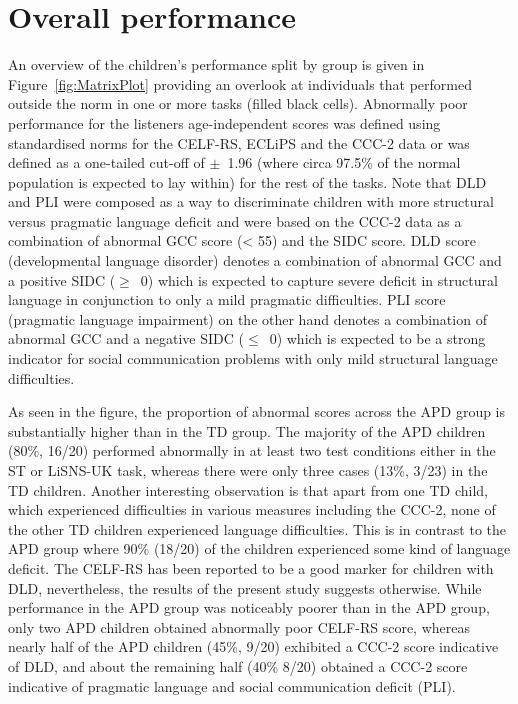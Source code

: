 \documentclass[a4paper, twoside]{templates/ociamthesis}
\begin{document}
\hypertarget{overall-performance}{%
\section{Overall performance}\label{overall-performance}}

An overview of the children's performance split by group is given in Figure~\ref{fig:MatrixPlot} providing an overlook at individuals that performed outside the norm in one or more tasks (filled black cells). Abnormally poor performance for the listeners age-independent scores was defined using standardised norms for the CELF-RS, ECLiPS and the CCC-2 data or was defined as a one-tailed cut-off of \(\pm\)~1.96 (where circa 97.5\% of the normal population is expected to lay within) for the rest of the tasks. Note that DLD and PLI were composed as a way to discriminate children with more structural versus pragmatic language deficit and were based on the CCC-2 data as a combination of abnormal GCC score (\textless{} 55) and the SIDC score. DLD score (developmental language disorder) denotes a combination of abnormal GCC and a positive SIDC (\(\geq\)~0) which is expected to capture severe deficit in structural language in conjunction to only a mild pragmatic difficulties. PLI score (pragmatic language impairment) on the other hand denotes a combination of abnormal GCC and a negative SIDC (\(\leq\)~0) which is expected to be a strong indicator for social communication problems with only mild structural language difficulties.~

As seen in the figure, the proportion of abnormal scores across the APD group is substantially higher than in the TD group. The majority of the APD children (80\%, 16/20) performed abnormally in at least two test conditions either in the ST or LiSNS-UK task, whereas there were only three cases (13\%, 3/23) in the TD children. Another interesting observation is that apart from one TD child, which experienced difficulties in various measures including the CCC-2, none of the other TD children experienced language difficulties. This is in contrast to the APD group where 90\% (18/20) of the children experienced some kind of language deficit. The CELF-RS has been reported to be a good marker for children with DLD, nevertheless, the results of the present study suggests otherwise. While performance in the APD group was noticeably poorer than in the APD group, only two APD children obtained abnormally poor CELF-RS score, whereas nearly half of the APD children (45\%, 9/20) exhibited a CCC-2 score indicative of DLD, and about the remaining half (40\% 8/20) obtained a CCC-2 score indicative of pragmatic language and social communication deficit (PLI).
\end{document}
